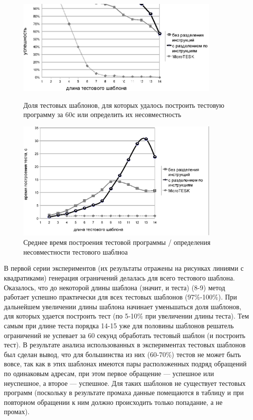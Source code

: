 \begin{figure}[p] \center
\parbox[t]{0.9\textwidth}{
  \includegraphics[width=0.9\textwidth]{4.analysis/success_exprmnt}%
\caption{Доля тестовых шаблонов, для которых удалось построить тестовую программу за 60с или определить их несовместность}\label{fig:success_experiment}
}

\vspace{1.5cm}

\parbox[t]{0.9\textwidth}{
  \includegraphics[width=0.9\textwidth]{4.analysis/time_exprmnt}
  \caption{Среднее время построения тестовой программы / определения несовместности тестового шаблноа}\label{fig:time_experiment}
}
\end{figure}

В первой серии экспериментов (их результаты отражены на рисунках линиями с
квадратиками) генерация ограничений делалась для всего тестового шаблона.
Оказалось, что до некоторой длины шаблона (значит, и теста) (8-9) метод работает
успешно практически для всех тестовых шаблонов (97\%-100\%). При дальнейшем
увеличении длины шаблона начинает уменьшаться доля шаблонов, для которых удается
построить тест (по 5-10\% при увеличении длины теста). Тем самым при длине теста
порядка 14-15 уже для половины шаблонов решатель ограничений не успевает за 60
секунд обработать тестовый шаблон (и построить тест). В результате анализа использованных в
экспериментах тестовых шаблонов был сделан вывод, что для большинства из них
(60-70\%) тестов не может быть вовсе, так как в этих шаблонах имеются пары расположенных подряд обращений
по одинаковым адресам, при этом первое обращение --- успешное или неуспешное, а второе --- успешное. Для таких шаблонов не существует тестовых программ (поскольку в результате промаха данные помещаются в таблицу и при повторном обращении к ним должно происходить только попадание, а не промах).

